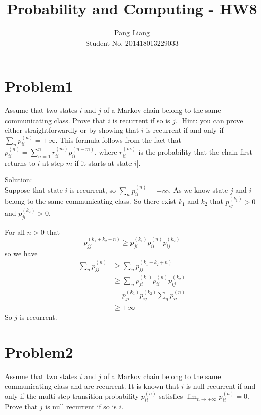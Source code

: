 \documentclass[12pt]{article}
\title{Probability and Computing - HW8}
\author{Pang Liang\\ Student No. 201418013229033}
\begin{document}
\maketitle

\section{Problem1}
Assume that two states $i$ and $j$ of a Markov chain belong to the same communicating class. Prove that $i$ is recurrent if so is $j$. [Hint: you can prove either straightforwardly or by showing that $i$ is recurrent if and only if $\sum_n p_{ii}^{(n)} = +\infty$. This formula follows from the fact that $p_{ii}^{(n)} = \sum_{n=1}^n r_{ii}^{(m)} p_{ii}^{(n-m)} $, where $r_{ii}^{(m)}$ is the probability that the chain first returns to $i$ at step $m$ if it starts at state $i$].

Solution:\\

Suppose that state $i$ is recurrent, so $\sum_n p_{ii}^{(n)} = +\infty$. As we know state $j$ and $i$ belong to the same communicating class. So there exist $k_1$ and $k_2$ that $p_{ij}^{(k_1)} >0$ and $p_{ji}^{(k_2)} >0$.

For all $n>0$ that
\begin{equation}
    p_{jj}^{(k_1+k_2+n)} \ge p_{ji}^{(k_1)} p_{ii}^{(n)} p_{ij}^{(k_2)}
\end{equation}
so we have
\begin{equation}
    \begin{split}
    \sum_n p_{jj}^{(n)} &\ge \sum_n p_{jj}^{(k_1+k_2+n)} \\
    &\ge \sum_n p_{ji}^{(k_1)} p_{ii}^{(n)} p_{ij}^{(k_2)} \\
    &= p_{ji}^{(k_1)} p_{ij}^{(k_2)} \sum_n p_{ii}^{(n)} \\
    &\ge +\infty
    \end{split}
\end{equation}
So $j$ is recurrent.

\section{Problem2}
Assume that two states $i$ and $j$ of a Markov chain belong to the same communicating class and are recurrent. It is known that $i$ is null recurrent if and only if the multi-step transition probability $p_{ii}^{(n)} $ satisfies $\lim_{n \to +\infty}p_{ii}^{(n)} = 0 $. Prove that $j$ is null recurrent if so is $i$.
\end{document}
